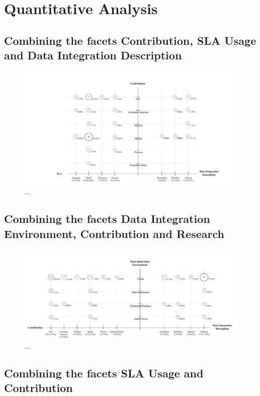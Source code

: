 \section{Quantitative Analysis}

\subsection{Combining the facets Contribution, SLA Usage and Data Integration Description}

\begin{figure}[h!]
\centering
\includegraphics[scale=0.5]{figs/bubble-charts/Contribution-SLA-DIdescription.pdf} 
\caption{...}
\end{figure}

\subsection{Combining the facets Data Integration Environment, Contribution and Research}

\begin{figure}[h!]
\centering
\includegraphics[scale=0.5]{figs/bubble-charts/DI-Environment-Contribution-Research.pdf}
\caption{...}
\end{figure}

\subsection{Combining the facets SLA Usage and Contribution}


